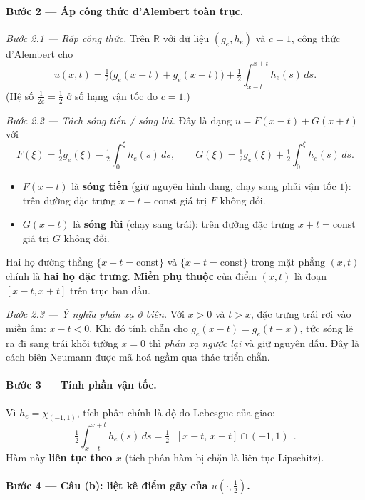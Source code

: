 \paragraph{Bước 2 --- Áp công thức d'Alembert toàn trục.}\leavevmode

\emph{Bước 2.1 --- Ráp công thức.} Trên $\mathbb{R}$ với dữ liệu $(g_e,h_e)$ và $c=1$, công thức d'Alembert cho
\[
  u(x,t)=\tfrac12\big(g_e(x-t)+g_e(x+t)\big)+\tfrac12\!\int_{x-t}^{x+t}\! h_e(s)\,ds.
\]
(Hệ số $\tfrac{1}{2c}=\tfrac12$ ở số hạng vận tốc do $c=1$.)

\emph{Bước 2.2 --- Tách sóng tiến / sóng lùi.} Đây là dạng $u=F(x-t)+G(x+t)$ với
\[
  F(\xi)=\tfrac12 g_e(\xi)-\tfrac12\!\int_0^{\xi}\! h_e(s)\,ds,
  \qquad
  G(\xi)=\tfrac12 g_e(\xi)+\tfrac12\!\int_0^{\xi}\! h_e(s)\,ds.
\]
\begin{itemize}
  \item $F(x-t)$ là \textbf{sóng tiến} (giữ nguyên hình dạng, chạy sang phải vận tốc $1$): trên đường đặc trưng $x-t=\text{const}$ giá trị $F$ không đổi.
  \item $G(x+t)$ là \textbf{sóng lùi} (chạy sang trái): trên đường đặc trưng $x+t=\text{const}$ giá trị $G$ không đổi.
\end{itemize}
Hai họ đường thẳng $\{x-t=\text{const}\}$ và $\{x+t=\text{const}\}$ trong mặt phẳng $(x,t)$ chính là \textbf{hai họ đặc trưng}. \textbf{Miền phụ thuộc} của điểm $(x,t)$ là đoạn $[x-t,x+t]$ trên trục ban đầu.

\emph{Bước 2.3 --- Ý nghĩa phản xạ ở biên.} Với $x>0$ và $t>x$, đặc trưng trái rơi vào miền âm: $x-t<0$. Khi đó tính chẵn cho
\(g_e(x-t)=g_e(t-x)\), tức sóng lẽ ra đi sang trái khỏi tường $x=0$ thì \emph{phản xạ ngược lại} và giữ nguyên dấu. Đây là cách biên Neumann được mã hoá ngầm qua thác triển chẵn.

\paragraph{Bước 3 --- Tính phần vận tốc.}
Vì $h_e=\chi_{(-1,1)}$, tích phân chính là độ đo Lebesgue của giao:
\[
  \tfrac12\!\int_{x-t}^{x+t}\! h_e(s)\,ds
  =\tfrac12\,\big|\,[x-t,\,x+t]\cap(-1,1)\,\big|.
\]
Hàm này \textbf{liên tục theo $x$} (tích phân hàm bị chặn là liên tục Lipschitz).

\paragraph{Bước 4 --- Câu (b): liệt kê điểm gãy của $u(\cdot,\tfrac12)$.}\leavevmode

